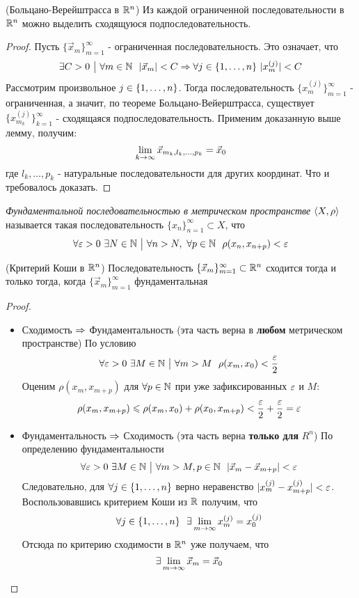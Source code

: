 \begin{theorem} (Больцано-Верейштрасса в $\mathbb{R}^n$)
	Из каждой ограниченной последовательности в $\mathbb{R}^n$ можно выделить сходящуюся подпоследовательность.
\end{theorem}

\begin{proof}
	Пусть $\{\vec{x}_m\}_{m = 1}^\infty$ - ограниченная последовательность. Это означает, что
	\[
		\exists C > 0 \such \forall m \in \N\ \ |\vec{x}_m| < C \Ra \forall j \in \range{n}\ |x_m^{(j)}| < C
	\]
	Рассмотрим произвольное $j \in \{1, \ldots, n\}$. Тогда последовательность $\{x_m^{(j)}\}_{m = 1}^\infty$ - ограниченная, а значит, по теореме Больцано-Вейерштрасса, существует $\{x_{m_k}^{(j)}\}_{k = 1}^\infty$ - сходящаяся подпоследовательность. Применим доказанную выше лемму, получим:
	\[
		\lim\limits_{k \to \infty} \vec{x}_{m_k, l_k, \ldots, p_k} = \vec{x}_0
	\]
	где $l_k, \ldots, p_k$ - натуральные последовательности для других координат. Что и требовалось доказать.
\end{proof}

\begin{definition}
	\textit{Фундаментальной последовательностью в метрическом пространстве} $\left\langle X, \rho\right\rangle$ называется такая последовательность $\{x_n\}_{n = 1}^\infty \subset X$, что
	\[
		\forall \varepsilon > 0\ \exists N \in \mathbb{N} \ \big|\  \forall n > N,\ \forall p \in \mathbb{N}\ \ \rho(x_n, x_{n + p}) < \varepsilon
	\]
\end{definition}

\begin{theorem} (Критерий Коши в $\mathbb{R}^n$)
	Последовательность $\{\vec{x}_m\}_{m = 1}^\infty \subset \mathbb{R}^n$ сходится тогда и только тогда, когда $\{\vec{x}_m\}_{m = 1}^\infty$ фундаментальная
\end{theorem}

\begin{proof}~
\begin{itemize}
	\item Сходимость $\Rightarrow$ Фундаментальность (эта часть верна в \textbf{любом} метрическом пространстве) По условию
	\[
		\forall \varepsilon > 0\ \exists M \in \mathbb{N} \ \big|\  \forall m > M\ \ \rho(x_m, x_0) < \frac{\varepsilon}{2}
	\]
	Оценим $\rho(x_m, x_{m + p})$ для $\forall p \in \mathbb{N}$ при уже зафиксированных $\varepsilon$ и $M$:
	\[
		\rho(x_m, x_{m + p}) \leqslant \rho(x_m, x_0) + \rho(x_0, x_{m + p}) < \frac{\varepsilon}{2} + \frac{\varepsilon}{2} = \varepsilon
	\]
	
	\item Фундаментальность $\Rightarrow$ Сходимость (эта часть верна \textbf{только для} $R^n$) По определению фундаментальности
	\[
		\forall \eps > 0\ \exists M \in \N \such \forall m > M, p \in \N\ \ |\vec{x}_m - \vec{x}_{m + p}| < \eps
	\]
	Следовательно, для $\forall j \in \{1, \ldots, n\}$ верно неравенство $|x_m^{(j)} - x_{m + p}^{(j)}| < \varepsilon$. Воспользовавшись критерием Коши из $\mathbb{R}$ получим, что
	\[
		\forall j \in \{1, \ldots, n\}\ \ \exists \lim\limits_{m \to \infty} x_m^{(j)} = x_0^{(j)}
	\]
	Отсюда по критерию сходимости в $\mathbb{R}^n$ уже получаем, что
	\[
		\exists \lim\limits_{m \to \infty} \vec{x}_m = \vec{x}_0
	\]
\end{itemize}
\end{proof}

